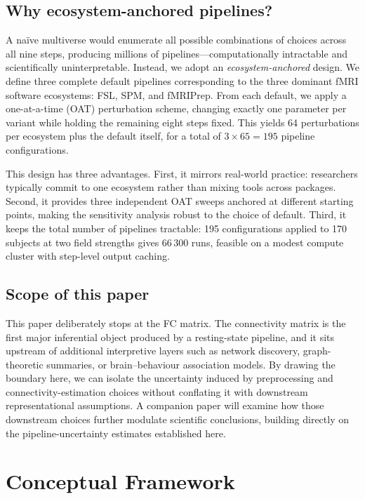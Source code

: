 \documentclass[11pt,a4paper]{article}
\begin{document}
\subsection{Why ecosystem-anchored pipelines?}

A na\"ive multiverse would enumerate all possible combinations of choices across all nine steps, producing millions of pipelines---computationally intractable and scientifically uninterpretable.  Instead, we adopt an \emph{ecosystem-anchored} design.  We define three complete default pipelines corresponding to the three dominant fMRI software ecosystems: FSL, SPM, and fMRIPrep.  From each default, we apply a one-at-a-time (OAT) perturbation scheme, changing exactly one parameter per variant while holding the remaining eight steps fixed.  This yields 64 perturbations per ecosystem plus the default itself, for a total of $3 \times 65 = 195$ pipeline configurations.

This design has three advantages.  First, it mirrors real-world practice: researchers typically commit to one ecosystem rather than mixing tools across packages.  Second, it provides three independent OAT sweeps anchored at different starting points, making the sensitivity analysis robust to the choice of default.  Third, it keeps the total number of pipelines tractable: 195 configurations applied to 170 subjects at two field strengths gives 66\,300 runs, feasible on a modest compute cluster with step-level output caching.

\subsection{Scope of this paper}

This paper deliberately stops at the FC matrix.  The connectivity matrix is the first major inferential object produced by a resting-state pipeline, and it sits upstream of additional interpretive layers such as network discovery, graph-theoretic summaries, or brain--behaviour association models.  By drawing the boundary here, we can isolate the uncertainty induced by preprocessing and connectivity-estimation choices without conflating it with downstream representational assumptions.  A companion paper will examine how those downstream choices further modulate scientific conclusions, building directly on the pipeline-uncertainty estimates established here.

\section{Conceptual Framework}
\end{document}
